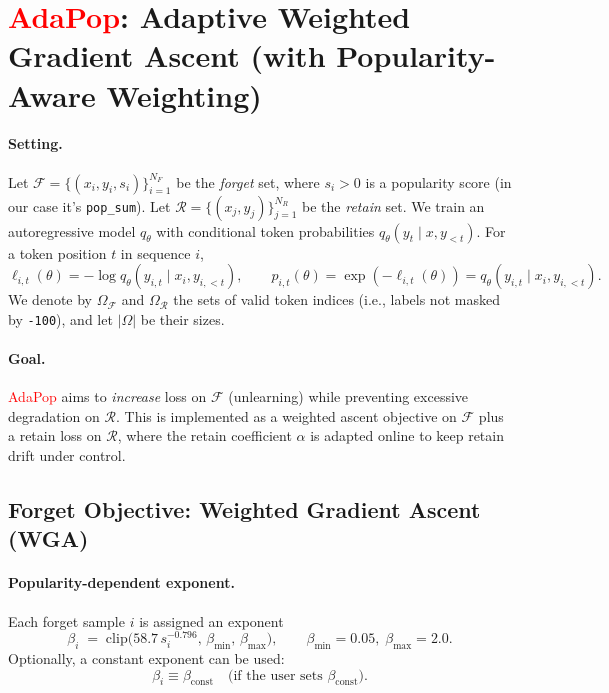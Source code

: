 \section{\textcolor{red}{AdaPop}: Adaptive Weighted Gradient Ascent (with Popularity-Aware Weighting)}

  \paragraph{Setting.}
  Let $\mathcal{F}=\{(x_i,y_i,s_i)\}_{i=1}^{N_F}$ be the \emph{forget} set, where $s_i>0$
  is a popularity score (in our case it's \texttt{pop\_sum}).
  Let $\mathcal{R}=\{(x_j,y_j)\}_{j=1}^{N_R}$ be the \emph{retain} set.
  We train an autoregressive model $q_\theta$ with conditional token probabilities
  $q_\theta(y_t\mid x,y_{<t})$.
  For a token position $t$ in sequence $i$,
  \[
  \ell_{i,t}(\theta) = -\log q_\theta(y_{i,t}\mid x_i,y_{i,<t}),
  \qquad
  p_{i,t}(\theta) = \exp(-\ell_{i,t}(\theta)) = q_\theta(y_{i,t}\mid x_i,y_{i,<t}).
  \]
  We denote by $\Omega_{\mathcal{F}}$ and $\Omega_{\mathcal{R}}$ the sets of valid
  token indices (i.e., labels not masked by \texttt{-100}), and let $|\Omega|$ be their sizes.

  \paragraph{Goal.}
  \textcolor{red}{AdaPop} aims to \emph{increase} loss on $\mathcal{F}$ (unlearning) while preventing
  excessive degradation on $\mathcal{R}$.
  This is implemented as a weighted ascent objective on $\mathcal{F}$ plus a retain loss on $\mathcal{R}$,
  where the retain coefficient $\alpha$ is adapted online to keep retain drift under control.

  \subsection{Forget Objective: Weighted Gradient Ascent (WGA)}

  \paragraph{Popularity-dependent exponent.}
  Each forget sample $i$ is assigned an exponent
  \[
  \beta_i \;=\; \mathrm{clip}\!\Big(58.7\,s_i^{-0.796},\,\beta_{\min},\,\beta_{\max}\Big),
  \qquad \beta_{\min}=0.05,\;\beta_{\max}=2.0.
  \]
  Optionally, a constant exponent can be used:
  \[
  \beta_i \equiv \beta_{\mathrm{const}} \quad \text{(if the user sets }\beta_{\mathrm{const}}\text{).}
  \]

